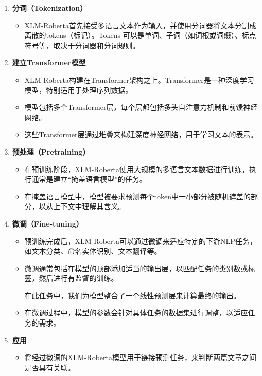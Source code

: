 \documentclass[
]{article}
\begin{document}
\begin{enumerate}
  \def\labelenumi{\arabic{enumi}.}
  \item
        \textbf{分词（Tokenization）}

        \begin{itemize}
          \item
                XLM-Roberta首先接受多语言文本作为输入，并使用分词器将文本分割成离散的tokens（标记）。Tokens
                可以是单词、子词（如词根或词缀）、标点符号等，取决于分词器和分词规则。
        \end{itemize}
  \item
        \textbf{建立Transformer模型}

        \begin{itemize}
          \item
                XLM-Roberta构建在Transformer架构之上。Transformer是一种深度学习模型，特别适用于处理序列数据。
          \item
                模型包括多个Transformer层，每个层都包括多头自注意力机制和前馈神经网络。
          \item
                这些Transformer层通过堆叠来构建深度神经网络，用于学习文本的表示。
        \end{itemize}
  \item
        \textbf{预处理（Pretraining）}

        \begin{itemize}
          \item
                在预训练阶段，XLM-Roberta使用大规模的多语言文本数据进行训练，执行通常是建立“掩盖语言模型”的任务。
          \item
                在掩盖语言模型中，模型被要求预测每个token中一小部分被随机遮盖的部分，以从上下文中理解其含义。
        \end{itemize}
  \item
        \textbf{微调（Fine-tuning）}

        \begin{itemize}
          \item
                预训练完成后，XLM-Roberta可以通过微调来适应特定的下游NLP任务，如文本分类、命名实体识别、文本翻译等。
          \item
                微调通常包括在模型的顶部添加适当的输出层，以匹配任务的类别数或标签，然后进行有监督的训练。

                在此任务中，我们为模型整合了一个线性预测层来计算最终的输出。
          \item
                在微调过程中，模型的参数会针对具体任务的数据集进行调整，以适应任务的需求。
        \end{itemize}
  \item
        \textbf{应用}

        \begin{itemize}
          \item
                将经过微调的XLM-Roberta模型用于链接预测任务，来判断两篇文章之间是否具有关联。
        \end{itemize}
\end{enumerate}
\end{document}
